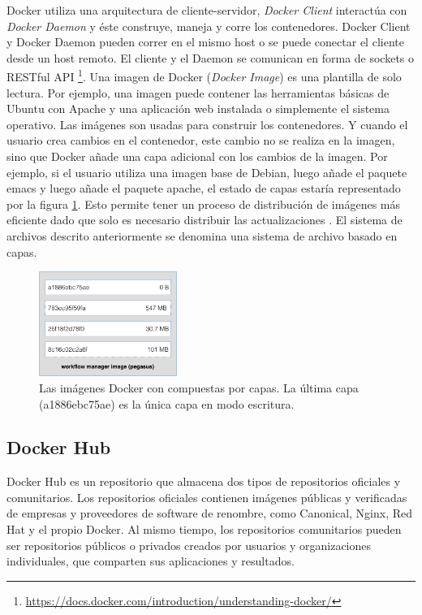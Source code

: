 Docker utiliza una arquitectura de cliente-servidor, \emph{Docker Client} interactúa con \emph{Docker Daemon} y éste construye, maneja y corre los contenedores. Docker Client y Docker Daemon pueden correr en el mismo host o se puede conectar el cliente desde un host remoto. El cliente y el Daemon se comunican en forma de sockets o RESTful API \footnote{\url{https://docs.docker.com/introduction/understanding-docker/}}. 
Una imagen de Docker (\textit{Docker Image}) es una plantilla de solo lectura. Por ejemplo, una imagen puede contener las herramientas básicas de Ubuntu con Apache y una aplicación web instalada o simplemente el sistema operativo. Las imágenes son usadas para construir los contenedores. Y cuando el usuario crea cambios en el contenedor, este cambio no se realiza en la imagen, sino  que Docker añade una capa adicional con los cambios de la imagen\cite{bui2015analysis}. Por ejemplo, si el usuario utiliza una imagen base de Debian, luego añade el paquete emacs y luego añade el paquete apache, el estado de capas estaría representado por la figura \ref{fig:arquitectura}. Esto permite tener un proceso de distribución de imágenes más eficiente dado que solo es necesario distribuir las actualizaciones \cite{bui2015analysis}. El sistema de archivos descrito anteriormente se denomina una sistema de archivo basado en capas.

\begin{figure}[t]
  \centering
  \includegraphics[width=0.4\textwidth]{Figures/docker-filesystems-multilayer}
    \caption[Capas de una imagen de Docker]{Las imágenes Docker con compuestas por capas. 
    La última capa (a1886ebc75ae) es la única capa en modo escritura.}
    \label{fig:arquitectura}
\end{figure}	


\subsection{Docker Hub}
Docker Hub es un repositorio que almacena dos tipos de repositorios oficiales y comunitarios. Los repositorios oficiales contienen imágenes públicas y verificadas de empresas y proveedores de software de renombre, como Canonical, Nginx, Red Hat y el propio Docker. Al mismo tiempo, los repositorios comunitarios pueden ser repositorios públicos o privados creados por usuarios y organizaciones individuales, que comparten sus aplicaciones y resultados. 

